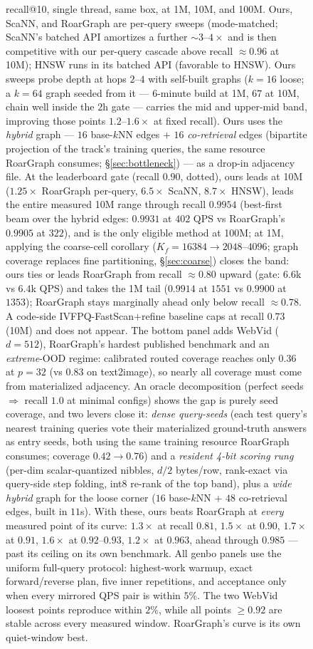 \documentclass{article}
\begin{document}
\begin{figure}[tp]
{recall@10, single thread, same box, at 1M, 10M, and 100M. Ours, ScaNN, and RoarGraph
are per-query sweeps (mode-matched; ScaNN's batched API amortizes a further
${\sim}3$--$4\times$ and is then competitive with our per-query cascade above recall
${\approx}0.96$ at 10M); HNSW runs in its batched API (favorable to HNSW). Ours sweeps
probe depth at hops $2$--$4$ with self-built graphs ($k{=}16$ loose; a $k{=}64$
graph seeded from it --- $6$-minute build at 1M, $67$ at 10M, chain well inside
the $2$h gate --- carries the mid and upper-mid band, improving those points
$1.2$--$1.6\times$ at fixed recall).
Ours uses the \emph{hybrid} graph --- $16$ base-$k$NN edges $+$ $16$
\emph{co-retrieval} edges (bipartite projection of the track's training queries, the
same resource RoarGraph consumes; \S\ref{sec:bottleneck}) --- as a drop-in adjacency
file. At the leaderboard gate (recall $0.90$, dotted), ours leads at 10M
($1.25\times$ RoarGraph per-query, $6.5\times$ ScaNN, $8.7\times$ HNSW), leads the
entire measured 10M range through recall $0.9954$ (best-first beam over the hybrid
edges: $0.9931$ at $402$ QPS vs RoarGraph's $0.9905$ at $322$), and is the only
eligible method at 100M; at 1M, applying the coarse-cell corollary ($K_f{=}16384\to2048$--$4096$; graph
coverage replaces fine partitioning, \S\ref{sec:coarse}) closes the band: ours ties
or leads RoarGraph from recall ${\approx}0.80$ upward (gate: $6.6$k vs $6.4$k QPS)
and takes the 1M tail ($0.9914$ at $1551$ vs $0.9900$ at $1353$); RoarGraph stays
marginally ahead only below recall ${\approx}0.78$. A code-side
IVFPQ-FastScan$+$refine baseline caps at recall $0.73$ (10M) and does not appear.
The bottom panel adds WebVid ($d{=}512$), RoarGraph's hardest published benchmark and
an \emph{extreme}-OOD regime: calibrated routed coverage reaches only $0.36$ at
$p{=}32$ (vs $0.83$ on text2image), so nearly all coverage must come from materialized
adjacency. An oracle decomposition (perfect seeds $\Rightarrow$ recall $1.0$ at
minimal configs) shows the gap is purely seed coverage, and two levers close it:
\emph{dense query-seeds} (each test query's nearest training queries vote their
materialized ground-truth answers as entry seeds, both using the same training
resource RoarGraph consumes; coverage $0.42\to0.76$) and a \emph{resident 4-bit
scoring rung} (per-dim scalar-quantized nibbles, $d/2$ bytes/row, rank-exact via
query-side step folding, int8 re-rank of the top band), plus a \emph{wide hybrid}
graph for the loose corner ($16$ base-$k$NN $+$ $48$ co-retrieval edges, built in
$11$s). With these, ours beats RoarGraph at \emph{every} measured point of its
curve: $1.3\times$ at recall $0.81$, $1.5\times$ at $0.90$, $1.7\times$ at $0.91$,
$1.6\times$ at $0.92$--$0.93$, $1.2\times$ at $0.963$, ahead through
$0.985$ --- past its ceiling on its own benchmark. All genbo panels use the uniform
full-query protocol: highest-work warmup, exact forward/reverse plan, five inner
repetitions, and acceptance only when every mirrored QPS pair is within $5\%$.
The two WebVid loosest points reproduce within $2\%$, while all points
${\ge}0.92$ are stable across every measured window. RoarGraph's curve is its own
quiet-window best.}
\label{fig:oodfrontier}
\end{figure}
\end{document}
